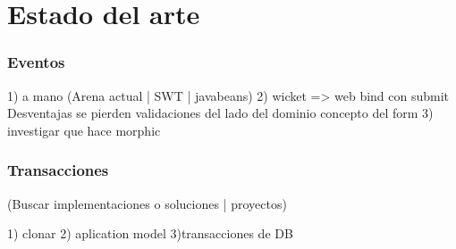 \section{Estado del arte}
\label{sec:StateOfTheArt}


\subsubsection{Eventos}

1) a mano (Arena actual | SWT | javabeans)
2) wicket => web
				bind con submit
		Desventajas
			se pierden validaciones del lado del dominio
			concepto del form
3) investigar que hace morphic




\subsubsection{Transacciones}

(Buscar implementaciones o soluciones | proyectos)

1) clonar
2) aplication model
3)transacciones de DB